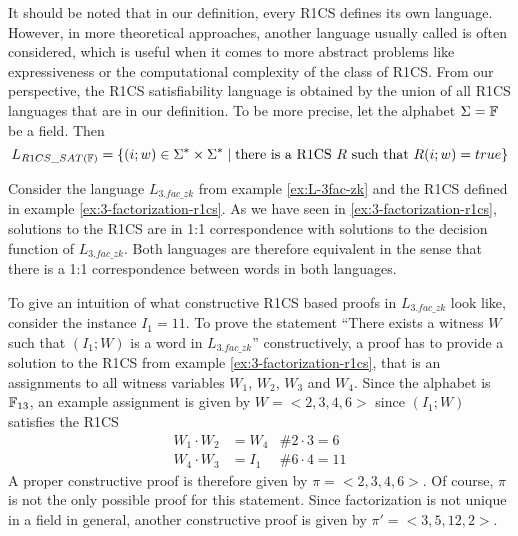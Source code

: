 \begin{remark}[R1CS satisfiability]\label{r1cs-satisfiability} It should be noted that in our definition, every R1CS defines its own language. However,  in more theoretical approaches, another language usually called  is often considered, which is useful when it comes to more abstract problems like expressiveness or the computational complexity of the class of  R1CS. From our perspective, the R1CS satisfiability language is obtained by the union of all R1CS languages that are in our definition. To be more precise, let the alphabet $\Sigma=\mathbb{F}$ be a field. Then 
$$
L_{R1CS\_SAT(\mathbb{F})} = \{(i;w)\in \Sigma^*\times \Sigma^*\;|\; \text{there is a R1CS $R$ such that } R(i;w)=true  \}
$$
\end{remark}
\begin{example}[3-Factorization]Consider the language $L_{3.fac\_zk}$ from example \ref{ex:L-3fac-zk} and the R1CS defined in example \ref{ex:3-factorization-r1cs}. As we have seen in \ref{ex:3-factorization-r1cs}, solutions to the R1CS are in 1:1 correspondence with solutions to the decision function of $L_{3.fac\_zk}$. Both languages are therefore equivalent in the sense that there is a 1:1 correspondence between words in both languages.

To give an intuition of what constructive R1CS based proofs in $L_{3.fac\_zk}$ look like, consider the instance $I_1= 11$. To prove the statement ``There exists a witness $W$ such that $(I_1;W)$ is a word in $L_{3.fac\_zk}$'' constructively, a proof has to provide a solution to the R1CS from example \ref{ex:3-factorization-r1cs}, that is an assignments to all witness variables $W_1$, $W_2$, $W_3$ and $W_4$. Since the alphabet is $\mathbb{F}_{13}$, an example assignment is given by
$W=<2,3,4,6>$ since $(I_1;W)$ satisfies the R1CS
\begin{align*}
W_1 \cdot W_2 &= W_4 & \text{\# } 2\cdot 3 = 6\\
W_4 \cdot W_3 &= I_1 & \text{\# } 6\cdot 4 = 11
\end{align*}
A proper constructive proof is therefore given by $\pi=<2,3,4,6>$. Of course, $\pi$ is not the only possible proof for this statement. Since factorization is not unique in a field in general, another constructive proof is given by $\pi'=<3,5,12,2>$. 
\end{example}
